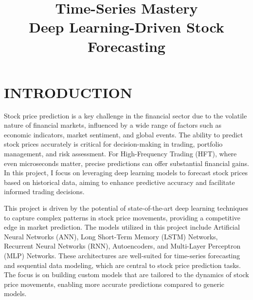 \documentclass[conference]{IEEEtran}
\begin{document}
\title{Time-Series Mastery\\
Deep Learning-Driven Stock Forecasting\\
}

\author{
}

\maketitle

\section{INTRODUCTION}

Stock price prediction is a key challenge in the financial sector due to the volatile nature of financial markets, influenced by a wide range of factors such as economic indicators, market sentiment, and global events. The ability to predict stock prices accurately is critical for decision-making in trading, portfolio management, and risk assessment. For High-Frequency Trading (HFT), where even microseconds matter, precise predictions can offer substantial financial gains. In this project, I focus on leveraging deep learning models to forecast stock prices based on historical data, aiming to enhance predictive accuracy and facilitate informed trading decisions.

This project is driven by the potential of state-of-the-art deep learning techniques to capture complex patterns in stock price movements, providing a competitive edge in market prediction. The models utilized in this project include Artificial Neural Networks (ANN), Long Short-Term Memory (LSTM) Networks, Recurrent Neural Networks (RNN), Autoencoders, and Multi-Layer Perceptron (MLP) Networks. These architectures are well-suited for time-series forecasting and sequential data modeling, which are central to stock price prediction tasks. The focus is on building custom models that are tailored to the dynamics of stock price movements, enabling more accurate predictions compared to generic models.
\end{document}

